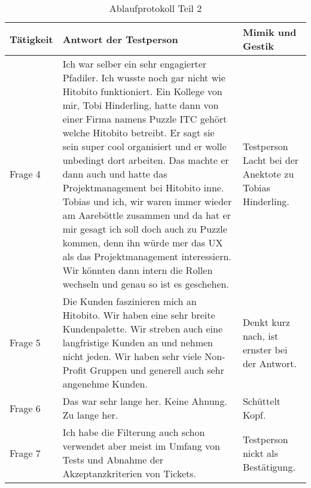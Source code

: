 \begin{table}[h!]
   \begin{tabular}{|L{0.3\textwidth}|L{0.4\textwidth}|L{0.2\textwidth}|}
       \hline
       \color{white}Tätigkeit & \color{white} Antwort der Testperson & \color{white} Mimik und Gestik \\
       \hline
       Frage 4 & Ich war selber ein sehr engagierter Pfadiler. Ich wusste noch gar nicht wie Hitobito funktioniert. Ein Kollege von mir, Tobi Hinderling, hatte
       dann von einer Firma namens Puzzle ITC gehört welche Hitobito betreibt. Er sagt sie sein super cool organisiert und er wolle unbedingt dort arbeiten. Das machte er
       dann auch und hatte das Projektmanagement bei Hitobito inne. Tobias und ich, wir waren immer wieder am Aareböttle zusammen und da hat er mir gesagt ich soll doch auch zu Puzzle kommen,
       denn ihn würde mer das UX als das Projektmanagement interessiern. Wir könnten dann intern die Rollen wechseln und genau so ist es geschehen. & Testperson Lacht bei der Anektote zu Tobias Hinderling. \\
       \hline
       Frage 5 & Die Kunden faszinieren mich an Hitobito. Wir haben eine sehr breite Kundenpalette. Wir streben auch eine langfristige Kunden an und nehmen nicht jeden.
       Wir haben sehr viele Non-Profit Gruppen und generell auch sehr angenehme Kunden. & Denkt kurz nach, ist ernster bei der Antwort. \\
       \hline
       Frage 6 & Das war sehr lange her. Keine Ahnung. Zu lange her. & Schüttelt Kopf. \\
       \hline
       Frage 7 & Ich habe die Filterung auch schon verwendet aber meist im Umfang von Tests und Abnahme der Akzeptanzkriterien von Tickets. & Testperson nickt als Bestätigung. \\
     \hline
     \end{tabular}
     \caption{Ablaufprotokoll Teil 2}
\end{table}

\newpage


